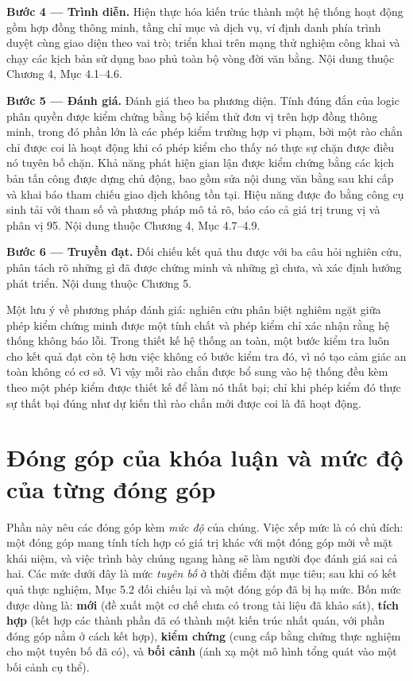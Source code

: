 \noindent \textbf{Bước 4 --- Trình diễn.} Hiện thực hóa kiến trúc thành một hệ thống hoạt động gồm hợp đồng thông minh, tầng chỉ mục và dịch vụ, ví định danh phía trình duyệt cùng giao diện theo vai trò; triển khai trên mạng thử nghiệm công khai và chạy các kịch bản sử dụng bao phủ toàn bộ vòng đời văn bằng. Nội dung thuộc Chương 4, Mục 4.1--4.6.

\noindent \textbf{Bước 5 --- Đánh giá.} Đánh giá theo ba phương diện. Tính đúng đắn của logic phân quyền được kiểm chứng bằng bộ kiểm thử đơn vị trên hợp đồng thông minh, trong đó phần lớn là các phép kiểm trường hợp vi phạm, bởi một rào chắn chỉ được coi là hoạt động khi có phép kiểm cho thấy nó thực sự chặn được điều nó tuyên bố chặn. Khả năng phát hiện gian lận được kiểm chứng bằng các kịch bản tấn công được dựng chủ động, bao gồm sửa nội dung văn bằng sau khi cấp và khai báo tham chiếu giao dịch không tồn tại. Hiệu năng được đo bằng công cụ sinh tải với tham số và phương pháp mô tả rõ, báo cáo cả giá trị trung vị và phân vị 95. Nội dung thuộc Chương 4, Mục 4.7--4.9.

\noindent \textbf{Bước 6 --- Truyền đạt.} Đối chiếu kết quả thu được với ba câu hỏi nghiên cứu, phân tách rõ những gì đã được chứng minh và những gì chưa, và xác định hướng phát triển. Nội dung thuộc Chương 5.

Một lưu ý về phương pháp đánh giá: nghiên cứu phân biệt nghiêm ngặt giữa phép kiểm chứng minh được một tính chất và phép kiểm chỉ xác nhận rằng hệ thống không báo lỗi. Trong thiết kế hệ thống an toàn, một bước kiểm tra luôn cho kết quả đạt còn tệ hơn việc không có bước kiểm tra đó, vì nó tạo cảm giác an toàn không có cơ sở. Vì vậy mỗi rào chắn được bổ sung vào hệ thống đều kèm theo một phép kiểm được thiết kế để làm nó thất bại; chỉ khi phép kiểm đó thực sự thất bại đúng như dự kiến thì rào chắn mới được coi là đã hoạt động.

\section{Đóng góp của khóa luận và mức độ của từng đóng góp}

Phần này nêu các đóng góp kèm \emph{mức độ} của chúng. Việc xếp mức là có chủ đích: một đóng góp mang tính tích hợp có giá trị khác với một đóng góp mới về mặt khái niệm, và việc trình bày chúng ngang hàng sẽ làm người đọc đánh giá sai cả hai. Các mức dưới đây là mức \emph{tuyên bố} ở thời điểm đặt mục tiêu; sau khi có kết quả thực nghiệm, Mục 5.2 đối chiếu lại và một đóng góp đã bị hạ mức. Bốn mức được dùng là: \textbf{mới} (đề xuất một cơ chế chưa có trong tài liệu đã khảo sát), \textbf{tích hợp} (kết hợp các thành phần đã có thành một kiến trúc nhất quán, với phần đóng góp nằm ở cách kết hợp), \textbf{kiểm chứng} (cung cấp bằng chứng thực nghiệm cho một tuyên bố đã có), và \textbf{bối cảnh} (ánh xạ một mô hình tổng quát vào một bối cảnh cụ thể).

